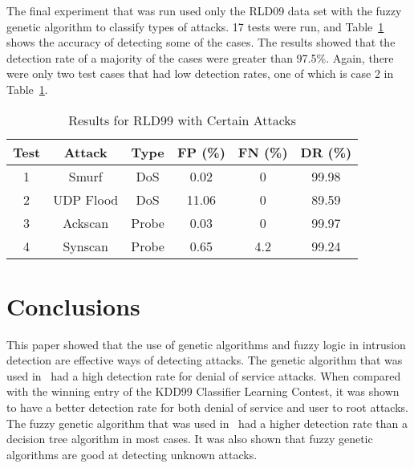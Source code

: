 \documentclass{sig-alternate}
\begin{document}
The final experiment that was run used only the RLD09 data set with the fuzzy genetic algorithm to classify types of attacks. 17 tests were run, and Table~\ref{tab:rldAttacks} shows the accuracy of detecting some of the cases. The results showed that the detection rate of a majority of the cases were greater than 97.5\%. Again, there were only two test cases that had low detection rates, one of which is case 2 in Table~\ref{tab:rldAttacks}.

\begin{table}
\caption{Results for RLD99 with Certain Attacks}
\vspace{0.20cm}
\begin{tabular}{cccccc}
Test & Attack & Type & FP (\%) & FN (\%) & DR (\%)\\ \hline
1 & Smurf & DoS & 0.02 & 0 & 99.98\\
2 & UDP Flood & DoS & 11.06 & 0 & 89.59\\
3 & Ackscan & Probe & 0.03 & 0 & 99.97\\
4 & Synscan & Probe & 0.65 & 4.2 & 99.24\\
\end{tabular}
\label{tab:rldAttacks}
\end{table}




\section{Conclusions}
\label{sec:conclusion}
This paper showed that the use of genetic algorithms and fuzzy logic in intrusion detection are effective ways of detecting attacks. The genetic algorithm that was used in~\cite{DBLP:journals/corr/abs-1204-1336} had a high detection rate for denial of service attacks. When compared with the winning entry of the KDD99 Classifier Learning Contest, it was shown to have a better detection rate for both denial of service and user to root attacks. The fuzzy genetic algorithm that was used in~\cite{6496342, 6559603} had a higher detection rate than a decision tree algorithm in most cases. It was also shown that fuzzy genetic algorithms are good at detecting unknown attacks. 








  
\end{document}

